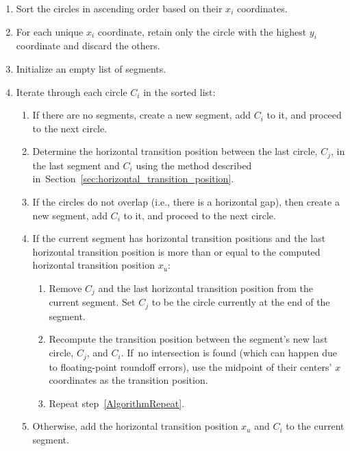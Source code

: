 \documentclass[12pt]{article}
\newcommand{\secrefplain}[1]{Section~\ref{#1}}
\begin{document}
\begin{enumerate}
	\item Sort the circles in ascending order based on their \( x_i \) coordinates.
	
	\item For each unique \( x_i \) coordinate, retain only the circle with the highest \( y_i \) coordinate and discard the others.
	
	\item Initialize an empty list of segments.
	
	\item Iterate through each circle \( C_i \) in the sorted list:
	\begin{enumerate}[label=(\alph*), ref=\theenumi(\alph*)]
		\item If there are no segments, create a new segment, add \( C_i \) to it, and proceed to the next circle.
		
		\item Determine the horizontal transition position between the last circle, \( C_j \), in the last segment and \( C_i \) using the method described in~\secrefplain{sec:horizontal_transition_position}.
		
		\item If the circles do not overlap (i.e., there is a horizontal gap), then create a new segment, add \( C_i \) to it, and proceed to the next circle.
		
		\item \label{AlgorithmRepeat} If the current segment has horizontal transition positions and the last horizontal transition position is more than or equal to the computed horizontal transition position \( x_u \):
		
		\begin{enumerate}[label=(\roman*)]
			\item Remove \( C_j \) and the last horizontal transition position from the current segment. Set \( C_j \) to be the circle currently at the end of the segment.
			
			\item Recompute the transition position between the segment's new last circle, \( C_j \), and \( C_i \). If~no intersection is found (which can happen due to floating-point roundoff errors), use the midpoint of their centers' \( x \) coordinates as the transition position.
			
			\item Repeat step~\ref{AlgorithmRepeat}.
		\end{enumerate}
		
		\item Otherwise, add the horizontal transition position \( x_u \) and \( C_i \) to the current segment.
	\end{enumerate}
\end{enumerate}
\end{document}
